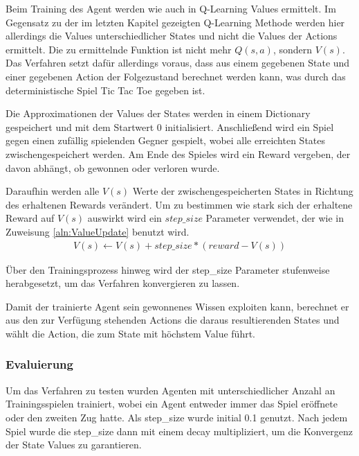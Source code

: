 \documentclass[11pt]{scrartcl}
\begin{document}
Beim Training des Agent werden wie auch in Q-Learning Values ermittelt. Im Gegensatz zu
der im letzten Kapitel gezeigten Q-Learning Methode werden hier allerdings die Values
unterschiedlicher States und nicht die Values der Actions ermittelt. Die zu ermittelnde
Funktion ist nicht mehr $Q(s, a)$, sondern $V(s)$. Das Verfahren setzt dafür allerdings
voraus, dass aus einem gegebenen State und einer gegebenen Action der Folgezustand
berechnet werden kann, was durch das deterministische Spiel Tic Tac Toe gegeben ist.

Die Approximationen der Values der States werden in einem Dictionary gespeichert und mit
dem Startwert 0 initialisiert. Anschließend wird ein Spiel gegen einen zufällig spielenden
Gegner gespielt, wobei alle erreichten States zwischengespeichert werden. Am Ende des
Spieles wird ein Reward vergeben, der davon abhängt, ob gewonnen oder verloren wurde.

Daraufhin werden alle $V(s)$ Werte der zwischengespeicherten States in Richtung des
erhaltenen Rewards verändert. Um zu bestimmen wie stark sich der erhaltene Reward auf $V(s)$
auswirkt wird ein $step\_size$ Parameter verwendet, der wie in Zuweisung 
\ref{aln:ValueUpdate} 
benutzt wird.
\begin{align}
  V(s) \leftarrow V(s) + step\_size * (reward - V(s))
  \label{aln:ValueUpdate}
\end{align}
\noindent

Über den Trainingsprozess hinweg wird der step\_size Parameter stufenweise herabgesetzt,
um das Verfahren konvergieren zu lassen.

Damit der trainierte Agent sein gewonnenes Wissen exploiten kann, berechnet er aus den
zur Verfügung stehenden Actions die daraus resultierenden States und wählt die Action, die
zum State mit höchstem Value führt.

\subsubsection{Evaluierung}
Um das Verfahren zu testen wurden Agenten mit unterschiedlicher Anzahl an Trainingsspielen
trainiert, wobei ein Agent entweder immer das Spiel eröffnete oder den zweiten Zug
hatte. Als step\_size wurde initial 0.1 genutzt. Nach jedem Spiel wurde die step\_size
dann mit einem decay multipliziert, um die Konvergenz der State Values zu garantieren.
\end{document}
